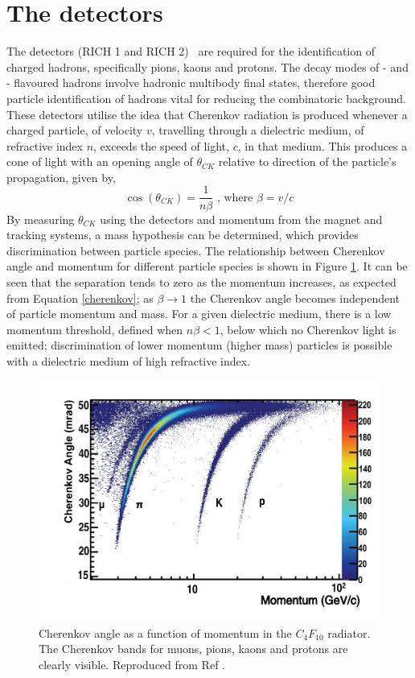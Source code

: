 \section{The \rich detectors}

The \rich detectors (RICH 1 and RICH 2)~\cite{LHCb-DP-2012-003} are required for the identification of charged hadrons, specifically pions, kaons and protons. The decay modes of \bquark- and \cquark- flavoured hadrons involve hadronic multibody final states, therefore good particle identification of hadrons vital for reducing the combinatoric background. These detectors utilise the idea that Cherenkov radiation is produced whenever a charged particle, of velocity $v$, travelling through a dielectric medium, of refractive index $n$, exceeds the speed of light, $c$, in that medium. This produces a cone of light with an opening angle of $\theta_{CK}$ relative to direction of the particle's propagation, given by,
\begin{equation}
\cos\left(\theta_{CK}\right) = \frac{1}{n\beta} \text{ ,     where }  \beta = v/c
\label{cherenkov}
\end{equation}
By measuring $\theta_{CK}$ using the \rich detectors and momentum from the magnet and tracking systems, a mass hypothesis can be determined, which provides discrimination between particle species. The relationship between Cherenkov angle and momentum for different particle species is shown in Figure \ref{richseparation}. It can be seen that the separation tends to zero as the momentum increases, as expected from Equation \ref{cherenkov}; as $\beta \rightarrow 1$ the Cherenkov angle becomes independent of particle momentum and mass. For a given dielectric medium, there is a low momentum threshold, defined when $n\beta < 1$, below which no Cherenkov light is emitted; discrimination of lower momentum (higher mass) particles is possible with a dielectric medium of high refractive index.

\begin{figure}
\centering
\includegraphics[width=0.8\linewidth]{figures/detector/richseparation.pdf}
\caption{Cherenkov angle as a function of momentum in the $C_{4}F_{10}$ radiator. The Cherenkov bands for muons, pions, kaons and protons are clearly visible. Reproduced from Ref \cite{LHCb-DP-2012-003}.}
\label{richseparation}
\end{figure}


